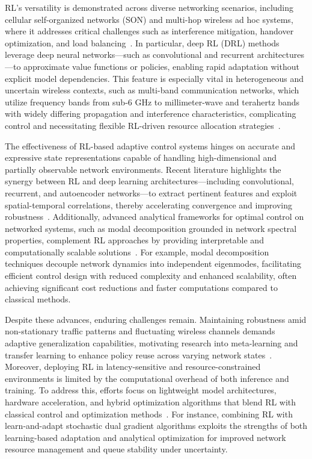 \documentclass[sigconf]{acmart}
\begin{document}
RL's versatility is demonstrated across diverse networking scenarios, including cellular self-organized networks (SON) and multi-hop wireless ad hoc systems, where it addresses critical challenges such as interference mitigation, handover optimization, and load balancing~\cite{ref31,ref32,ref33,ref34,ref35}. In particular, deep RL (DRL) methods leverage deep neural networks—such as convolutional and recurrent architectures—to approximate value functions or policies, enabling rapid adaptation without explicit model dependencies. This feature is especially vital in heterogeneous and uncertain wireless contexts, such as multi-band communication networks, which utilize frequency bands from sub-6 GHz to millimeter-wave and terahertz bands with widely differing propagation and interference characteristics, complicating control and necessitating flexible RL-driven resource allocation strategies~\cite{ref12}.

The effectiveness of RL-based adaptive control systems hinges on accurate and expressive state representations capable of handling high-dimensional and partially observable network environments. Recent literature highlights the synergy between RL and deep learning architectures—including convolutional, recurrent, and autoencoder networks—to extract pertinent features and exploit spatial-temporal correlations, thereby accelerating convergence and improving robustness~\cite{ref31,ref2,ref50}. Additionally, advanced analytical frameworks for optimal control on networked systems, such as modal decomposition grounded in network spectral properties, complement RL approaches by providing interpretable and computationally scalable solutions~\cite{ref32,ref34}. For example, modal decomposition techniques decouple network dynamics into independent eigenmodes, facilitating efficient control design with reduced complexity and enhanced scalability, often achieving significant cost reductions and faster computations compared to classical methods.

Despite these advances, enduring challenges remain. Maintaining robustness amid non-stationary traffic patterns and fluctuating wireless channels demands adaptive generalization capabilities, motivating research into meta-learning and transfer learning to enhance policy reuse across varying network states~\cite{ref35}. Moreover, deploying RL in latency-sensitive and resource-constrained environments is limited by the computational overhead of both inference and training. To address this, efforts focus on lightweight model architectures, hardware acceleration, and hybrid optimization algorithms that blend RL with classical control and optimization methods~\cite{ref5,ref33}. For instance, combining RL with learn-and-adapt stochastic dual gradient algorithms exploits the strengths of both learning-based adaptation and analytical optimization for improved network resource management and queue stability under uncertainty.
\end{document}
